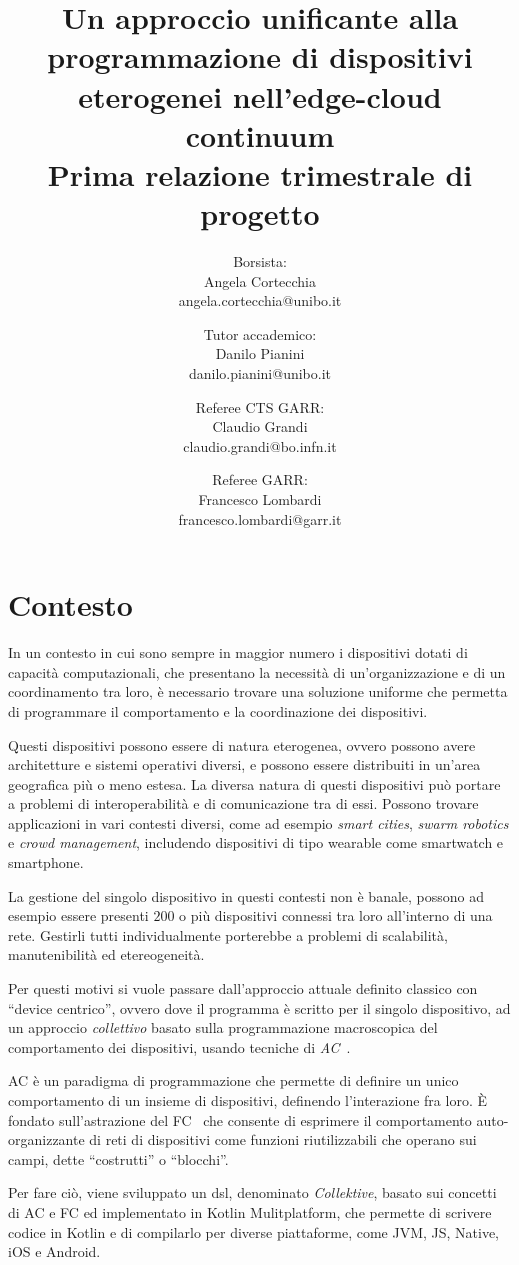 \documentclass[13pt, a4paper]{scrartcl}
\title{\LARGE
    Un approccio unificante alla programmazione di dispositivi eterogenei nell'edge-cloud continuum \\ \small Prima relazione trimestrale di progetto
}
\author{
   Borsista: \\Angela Cortecchia \\ \small angela.cortecchia@unibo.it
    \and
    Tutor accademico: \\Danilo Pianini \\ \small danilo.pianini@unibo.it
    \and
    Referee CTS GARR: \\Claudio Grandi \\ \small claudio.grandi@bo.infn.it
    \and
    Referee GARR: \\Francesco Lombardi \\ \small francesco.lombardi@garr.it
}
\newcommand{\ck}{\emph{Collektive}}
\begin{document}
\maketitle
\clearpage


\section{Contesto}
\label{sec:context}
In un contesto in cui sono sempre in maggior numero i dispositivi dotati di capacità computazionali,
    che presentano la necessità di un'organizzazione e di un coordinamento tra loro,
    è necessario trovare una soluzione uniforme che permetta di programmare il comportamento e la coordinazione dei dispositivi.

Questi dispositivi possono essere di natura eterogenea, ovvero possono avere architetture e sistemi operativi diversi,
    e possono essere distribuiti in un'area geografica più o meno estesa.
%
La diversa natura di questi dispositivi può portare a problemi di interoperabilità e di comunicazione tra di essi.
%
Possono trovare applicazioni in vari contesti diversi, come ad esempio \emph{smart cities}, \emph{swarm robotics} e \emph{crowd management},
    includendo dispositivi di tipo wearable come smartwatch e smartphone.

La gestione del singolo dispositivo in questi contesti non è banale, possono ad esempio essere presenti $200$ o più dispositivi
    connessi tra loro all'interno di una rete.
%
Gestirli tutti individualmente porterebbe a problemi di scalabilità, manutenibilità ed etereogeneità.

Per questi motivi si vuole passare dall'approccio attuale definito classico con ``device centrico'', ovvero dove il programma è scritto per il singolo dispositivo,
    ad un approccio \emph{collettivo} basato sulla programmazione macroscopica del comportamento dei dispositivi,
    usando tecniche di \emph{\ac{AC}}~\cite{BealIEEEComputer2015}.

\ac{AC} è un paradigma di programmazione che permette di definire un unico comportamento di un insieme di dispositivi,
    definendo l'interazione fra loro.
%
È fondato sull'astrazione del \ac{FC}~\cite{JLAMP2019} che consente di esprimere il comportamento auto-organizzante di reti
    di dispositivi come funzioni riutilizzabili che operano sui campi, dette ``costrutti'' o ``blocchi''.

Per fare ciò, viene sviluppato un \ac{dsl}, denominato \ck{}, basato sui concetti di \ac{AC} e \ac{FC} ed implementato in Kotlin Mulitplatform,
    che permette di scrivere codice in Kotlin e di compilarlo per diverse piattaforme, come JVM, JS, Native, iOS e Android.
\end{document}
